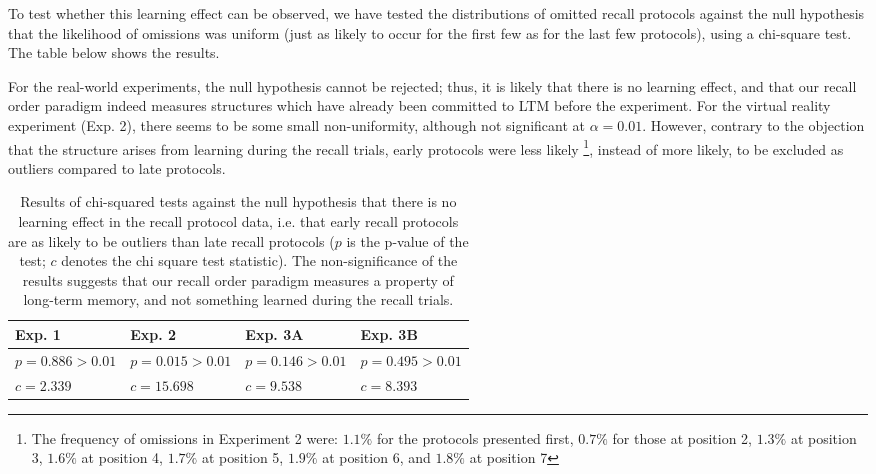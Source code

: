 To test whether this learning effect can be observed, we have tested the distributions of omitted recall protocols against the null hypothesis that the likelihood of omissions was uniform (just as likely to occur for the first few as for the last few protocols), using a chi-square test. The table below shows the results. 

For the real-world experiments, the null hypothesis cannot be rejected; thus, it is likely that there is no learning effect, and that our recall order paradigm indeed measures structures which have already been committed to LTM before the experiment. For the virtual reality experiment (Exp. 2), there seems to be some small non-uniformity, although not significant at $\alpha=0.01$. However, contrary to the objection that the structure arises from learning during the recall trials, early protocols were less likely \footnote{The frequency of omissions in Experiment 2 were: $1.1\%$ for the protocols presented first, $0.7 \%$ for those at position 2, $1.3\%$ at position 3, $1.6\%$ at position 4, $1.7\%$ at position 5, $1.9\%$ at position 6, and $1.8\%$ at position 7}, instead of more likely, to be excluded as outliers compared to late protocols. 

\begin{table}
	\centering
	\begin{tabularx}{\textwidth}{XXXX}
		\textbf{Exp. 1} & \textbf{Exp. 2} & \textbf{Exp. 3A}  & \textbf{Exp. 3B} \\ \hline
		$p=0.886 > 0.01$ & $p=0.015 > 0.01$ & $p=0.146 > 0.01$ & $p=0.495 > 0.01$  \\
		$c=2.339$ & $c=15.698$ & $c=9.538$ & $c=8.393$  \\ \hline
	\end{tabularx}
	\caption{Results of chi-squared tests against the null hypothesis that there is no learning effect in the recall protocol data, i.e. that early recall protocols are as likely to be outliers than late recall protocols ($p$ is the p-value of the test; $c$ denotes the chi square test statistic). The non-significance of the results suggests that our recall order paradigm measures a property of long-term memory, and not something learned during the recall trials.}
	\label{tbl_chisq}
\end{table}

